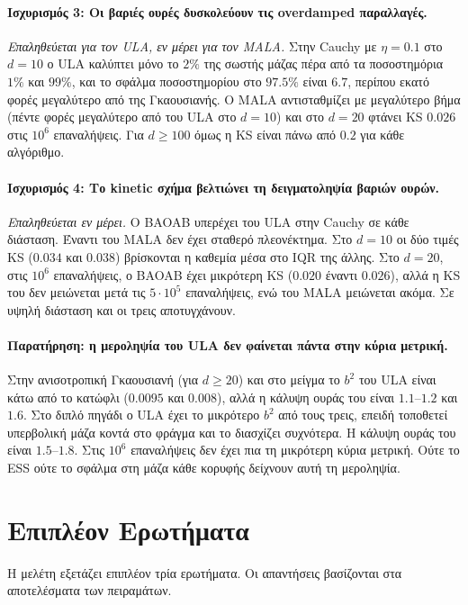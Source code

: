 \paragraph{Ισχυρισμός 3: Οι βαριές ουρές δυσκολεύουν τις overdamped παραλλαγές.}
\emph{Επαληθεύεται για τον ULA, εν μέρει για τον MALA.} Στην Cauchy με $\eta = 0.1$ στο
$d=10$ ο ULA καλύπτει μόνο το $2\%$ της σωστής μάζας πέρα από τα ποσοστημόρια $1\%$
και $99\%$, και το σφάλμα ποσοστημορίου στο $97.5\%$ είναι $6.7$, περίπου εκατό φορές
μεγαλύτερο από της Γκαουσιανής. Ο MALA αντισταθμίζει με μεγαλύτερο βήμα (πέντε φορές
μεγαλύτερο από του ULA στο $d=10$) και στο $d=20$ φτάνει KS $0.026$ στις $10^6$
επαναλήψεις.
Για $d \ge 100$ όμως η KS είναι πάνω από $0.2$ για κάθε αλγόριθμο.

\paragraph{Ισχυρισμός 4: Το kinetic σχήμα βελτιώνει τη δειγματοληψία βαριών ουρών.}
\emph{Επαληθεύεται εν μέρει.} Ο BAOAB υπερέχει του ULA στην Cauchy σε κάθε διάσταση.
Έναντι του MALA δεν έχει σταθερό πλεονέκτημα. Στο $d=10$ οι δύο τιμές KS ($0.034$ και $0.038$) βρίσκονται η καθεμία μέσα στο IQR της άλλης. Στο
$d=20$, στις $10^6$ επαναλήψεις, ο BAOAB έχει μικρότερη KS ($0.020$ έναντι $0.026$),
αλλά η KS του δεν μειώνεται μετά τις $5 \cdot 10^5$ επαναλήψεις, ενώ του MALA
μειώνεται ακόμα. Σε υψηλή διάσταση και οι τρεις
αποτυγχάνουν.

\paragraph{Παρατήρηση: η μεροληψία του ULA δεν φαίνεται πάντα στην κύρια μετρική.}
Στην ανισοτροπική Γκαουσιανή (για $d \ge 20$) και στο μείγμα το
$b^2$ του ULA είναι κάτω από το κατώφλι ($0.0095$ και $0.008$), αλλά η κάλυψη ουράς του είναι $1.1$--$1.2$
και $1.6$. Στο διπλό πηγάδι ο ULA έχει το μικρότερο $b^2$ από τους τρεις, επειδή
τοποθετεί υπερβολική μάζα κοντά στο φράγμα και το διασχίζει συχνότερα. Η κάλυψη
ουράς του είναι $1.5$--$1.8$. Στις $10^6$ επαναλήψεις δεν έχει πια τη μικρότερη κύρια μετρική. Ούτε το
ESS ούτε το σφάλμα στη μάζα κάθε κορυφής δείχνουν αυτή τη μεροληψία.

\section{Επιπλέον Ερωτήματα}
\label{sec:concl-questions}

Η μελέτη εξετάζει επιπλέον τρία ερωτήματα. Οι απαντήσεις βασίζονται στα
αποτελέσματα των πειραμάτων.

